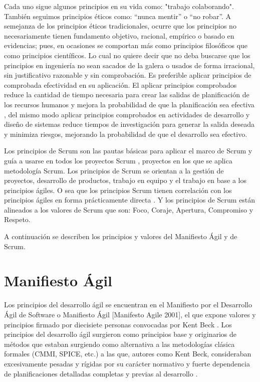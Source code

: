Cada uno sigue algunos principios en su vida como: "trabajo colaborando". También seguimos principios éticos como: “nunca mentir” o “no robar”. A semejanza de los principios éticos tradicionales, ocurre que los principios no necesariamente tienen fundamento objetivo, racional, empírico o basado en evidencias; pues, en ocasiones se comportan más como principios filosóficos que como principios científicos. Lo cual no quiere decir que no deba buscarse que los principios en ingeniería no sean sacados de la galera o usados de forma irracional, sin justificativo razonable y sin comprobación. Es preferible aplicar principios de comprobada efectividad en su aplicación. El aplicar principios comprobados reduce la cantidad de tiempo necesaria para crear las salidas de planificación de los recursos humanos y mejora la probabilidad de que la planificación sea efectiva \cite{PMBOK-2004}, del mismo modo aplicar principios comprobados en actividades de desarrollo y diseño de sistemas reduce tiempos de investigación para generar la salida deseada y minimiza riesgos, mejorando la probabilidad de que el desarrollo sea efectivo. 

Los principios de Scrum son las pautas básicas para aplicar el marco de Scrum y guía a usarse en todos los proyectos Scrum \cite{SBOK-2013}, proyectos en los que se aplica metodología Scrum. Los principios de Scrum se orientan a la gestión de proyectos, desarrollo de productos, trabajo en equipo y el trabajo en base a los principios ágiles. O sea que los principios Scrum tienen correlación con los principios ágiles en forma prácticamente directa \cite{Agile-Atlas-2012}. Y los principios de Scrum están alineados a los valores de Scrum que son: Foco, Coraje, Apertura, Compromiso y Respeto.


A continuación se describen los principios y valores del Manifiesto Ágil y de Scrum.

\section{Manifiesto Ágil}

Los principios del desarrollo ágil se encuentran en el Manifiesto por el Desarrollo Ágil de Software o Manifiesto Ágil [Manifesto Agile 2001], el que expone valores y principios firmado por diecisiete personas convocadas por Kent Beck \cite{Beck-2001}. Los principios del desarrollo ágil surgieron como principios base y originarios de métodos que estaban surgiendo como alternativa a las metodologías clásica formales (CMMI, SPICE, etc.) a las que, autores como Kent Beck, consideraban excesivamente pesadas y rígidas por su carácter normativo y fuerte dependencia de planificaciones detalladas completas y previas al desarrollo \cite{Wiki-2015}.

